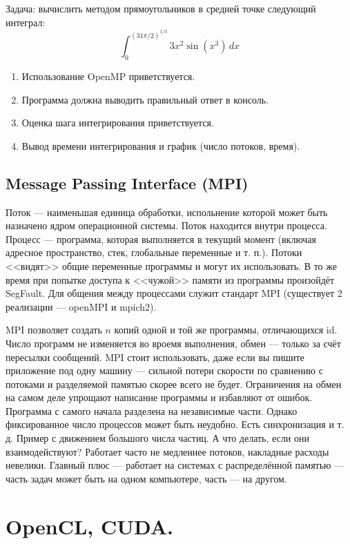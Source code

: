 \documentclass{book}
\begin{document}
Задача: вычислить методом прямоугольников в средней точке следующий интеграл:
\begin{equation}
  \int_0^{(31 \pi /2)^{1/3}} 3 x^2 \sin (x^3) \, dx
\end{equation}
\begin{enumerate}
  \item Использование OpenMP приветствуется. %
  \item Программа должна выводить правильный ответ в консоль. %
  \item Оценка шага интегрирования приветствуется. %
  \item Вывод времени интегрирования и график (число потоков, время). %
\end{enumerate}

\subsection{Message Passing Interface (MPI)}

Поток --- наименьшая единица обработки, испольнение которой может быть назначено
ядром операционной системы. Поток находится внутри процесса. Процесс ---
программа, которая выполняется в текущий момент (включая адресное пространство,
стек, глобальные переменные и т. п.). Потоки <<видят>> общие переменные
программы и могут их использовать. В то же время при попытке доступа к <<чужой>>
памяти из программы произойдёт SegFault. Для общения между процессами служит
стандарт MPI (существует 2 реализации --- openMPI и mpich2).

MPI позволяет создать $n$ копий одной и той же программы, отличающихся id. Число программ не
изменяется во вроемя выполнения, обмен --- только за счёт пересылки сообщений. MPI стоит
использовать, даже если вы пишите приложение под одну машину --- сильной потери скорости по
сравнению с потоками и разделяемой памятью скорее всего не будет. Ограничения на обмен на самом
деле упрощают написание программы и избавляют от ошибок. Программа с самого начала разделена на
независимые части. Однако фиксированное число процессов может быть неудобно.  Есть синхронизация и
т. д. Пример с движением большого числа частиц. А что делать, если они взаимодействуют? Работает
часто не медленнее потоков, накладные расходы невелики. Главный плюс --- работает на системах с
распределённой памятью --- часть задач может быть на одном компьютере, часть --- на другом.

\section{OpenCL, CUDA.}
\end{document}
